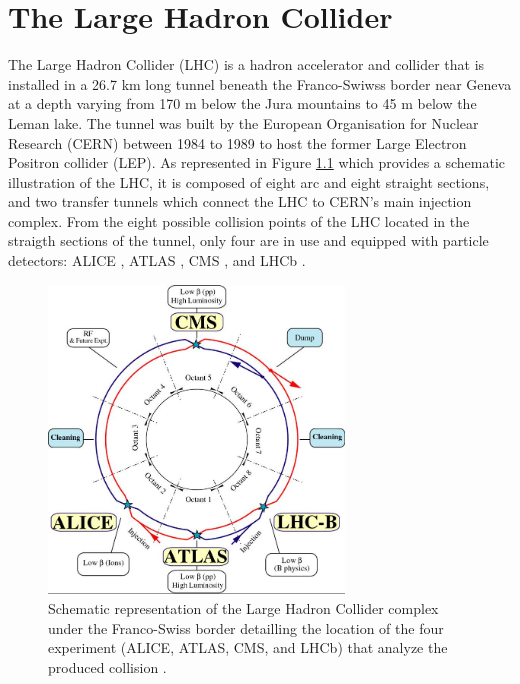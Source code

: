 \chapter{The Large Hadron Collider}
\label{chap:I-2-lhc}

	The Large Hadron Collider (LHC) \cite{Evans:2008zzb} is a hadron accelerator and collider that is installed in a 26.7 km long tunnel beneath the Franco-Swiwss border near Geneva at a depth varying from 170 m below the Jura mountains to 45 m below the Leman lake. The tunnel was built by the European Organisation for Nuclear Research (CERN) between 1984 to 1989 to host the former Large Electron Positron collider (LEP). As represented in Figure \ref{fig:I-2-lhc-schematic} which provides a schematic illustration of the LHC, it is composed of eight arc and eight straight sections, and two transfer tunnels which connect the LHC to CERN's main injection complex. From the eight possible collision points of the LHC located in the straigth sections of the tunnel, only four are in use and equipped with particle detectors: ALICE \cite{1748-0221-3-08-S08002}, ATLAS \cite{1748-0221-3-08-S08003}, CMS \cite{1748-0221-3-08-S08004}, and LHCb \cite{1748-0221-3-08-S08005}. \\

	\begin{figure}[h!]
		\centering
		\includegraphics[width=0.7\textwidth]{img/I-2-lhc/lhc.jpg}
		\caption{Schematic representation of the Large Hadron Collider complex under the Franco-Swiss border detailling the location of the four experiment (ALICE, ATLAS, CMS, and LHCb) that analyze the produced collision \cite{Evans:2008zzb}.}
		\label{fig:I-2-lhc-schematic}
	\end{figure}

